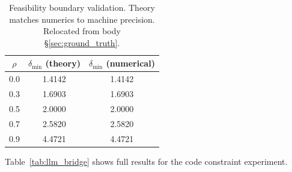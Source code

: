 \documentclass{article}
\theoremstyle{plain}
\theoremstyle{definition}
\theoremstyle{remark}
\begin{document}
\begin{table}[ht]
\centering
\small
\caption{Feasibility boundary validation. Theory matches numerics to machine precision. Relocated from body \S\ref{sec:ground_truth}.}
\label{tab:feasibility}
\begin{tabular}{ccc}
\toprule
$\rho$ & $\delta_{\min}$ (theory) & $\delta_{\min}$ (numerical) \\
\midrule
0.0 & 1.4142 & 1.4142 \\
0.3 & 1.6903 & 1.6903 \\
0.5 & 2.0000 & 2.0000 \\
0.7 & 2.5820 & 2.5820 \\
0.9 & 4.4721 & 4.4721 \\
\bottomrule
\end{tabular}
\end{table}

Table~\ref{tab:llm_bridge} shows full results for the code constraint experiment.

\begin{table}[ht]
\centering
\small
\caption{Code constraint experiment. Pass = (tests pass) $\land$ (format valid). $\Delta$ = staged $-$ one-shot.}
\label{tab:llm_bridge}
\end{table}
\end{document}
